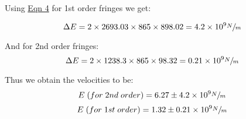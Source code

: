	\vspace{-5mm}
	Using \hyperref[eqn:4]{Eqn 4} for 1st order fringes we get:
	
	\vspace{-5mm}
	$$
	\Delta E
	     = 2 \times 2693.03 \times 865 \times 898.02
		 = 4.2\times 10^9 \sfrac{N}{m}
	$$

	And for 2nd order fringes:
	$$
	\Delta E
	     = 2 \times 1238.3 \times 865 \times 98.32
		 = 0.21 \times 10^9 \sfrac{N}{m}
	$$

	Thus we obtain the velocities to be:
	$$E\;(for\;2nd\;order) = 6.27 \pm 4.2\times 10^9 \sfrac{N}{m}$$
	$$E\;(for\;1st\;order) = 1.32 \pm 0.21\times 10^9 \sfrac{N}{m}$$
